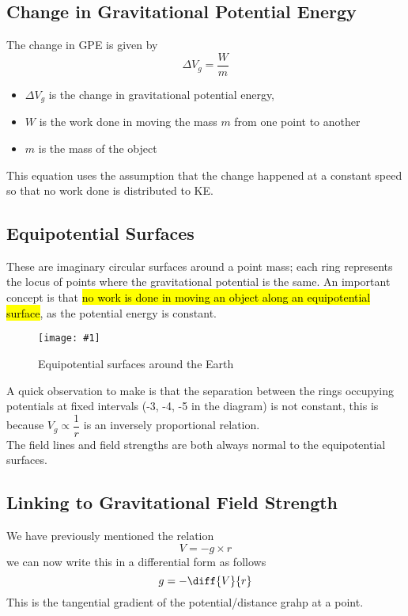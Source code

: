 \documentclass[a4paper,12pt]{article}
\newcommand{\lb}{\\[8pt]}
\newcommand{\img}[4]{\begin{center}
  \begin{figure}[H]
    \centering
    \texttt{[image: \#1]}
    \caption{#3}
    \label{fig:#4}
  \end{figure}
\end{center}}
\begin{document}
\subsection{Change in Gravitational Potential Energy}

The change in GPE is given by
\begin{equation}\label{eq:change_GPE}
  \Delta V_g = \frac{W}{m}
\end{equation}
\begin{itemize}
  \item $\Delta V_g$ is the change in gravitational potential energy,
  \item $W$ is the work done in moving the mass $m$ from one point to another
  \item $m$ is the mass of the object
\end{itemize}
This equation uses the assumption that the change happened at a constant speed so that no work done is distributed to KE.

\subsection{Equipotential Surfaces}

These are imaginary circular surfaces around a point mass; each ring represents the locus of points where the gravitational potential is the same. An important concept is that \hl{no work is done in moving an object along an equipotential surface}, as the potential energy is constant.

\img{equipotential-surfaces.png}{0.5}{Equipotential surfaces around the Earth}{equipotential}

A quick observation to make is that the separation between the rings occupying potentials at fixed intervals (-3, -4, -5 in the diagram) is not constant, this is because $V_g \propto \dfrac{1}{r}$ is an inversely proportional relation.\lb
The field lines and field strengths are both always normal to the equipotential surfaces.

\subsection{Linking to Gravitational Field Strength}

We have previously mentioned the relation $$V = -g\times r$$
we can now write this in a differential form as follows
$$g = -\diff{V}{r}$$
This is the tangential gradient of the potential/distance grahp at a point.
\end{document}
